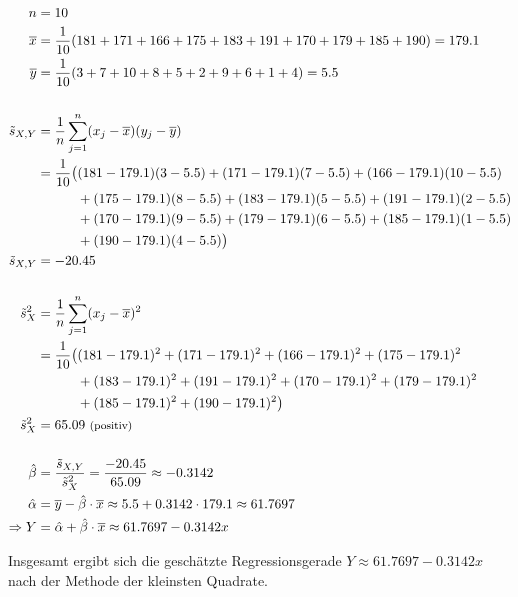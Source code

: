 {\allowdisplaybreaks
    \begin{align*}
        n &= 10 \\*
        \overline{x} &= \frac{1}{10} (181 + 171 + 166 + 175 + 183 +191 + 170 + 179 + 185 + 190) = 179.1 \\*
        \overline{y} &= \frac{1}{10} (3 + 7 + 10 + 8 + 5 + 2 + 9 + 6 + 1 + 4) = 5.5 \\*
        \nonumber \\
        \tilde{s}_{X,Y} &= \frac1n \sum_{j=1}^{n} (x_j - \overline{x})(y_j - \overline{y}) \\*
        &= \frac{1}{10} \big( (181 - 179.1) (3 - 5.5) + (171 - 179.1) (7 - 5.5) + (166 - 179.1) (10 - 5.5) \\*
            &\qquad\quad + (175 - 179.1) (8 - 5.5)  + (183 - 179.1) (5 - 5.5) + (191 - 179.1) (2 - 5.5) \\*
            &\qquad\quad + (170 - 179.1) (9 - 5.5) + (179 - 179.1) (6 - 5.5) + (185 - 179.1) (1 - 5.5) \\*
            &\qquad\quad + (190 - 179.1) (4 - 5.5) \big) \\*
        \tilde{s}_{X,Y} &= -20.45 \\
        \nonumber \\
        \tilde{s}_X^2 &= \frac1n \sum_{j=1}^{n} (x_j - \overline{x})^2 \\*
        &= \frac{1}{10} \big( (181 - 179.1)^2 + (171 - 179.1)^2 + (166 - 179.1)^2 + (175 - 179.1)^2 \\*
            &\qquad\quad + (183 - 179.1)^2 + (191 - 179.1)^2 + (170 - 179.1)^2 + (179 - 179.1)^2 \\*
            &\qquad\quad + (185 - 179.1)^2 + (190 - 179.1)^2 \big) \\*
        \tilde{s}_X^2 &= 65.09 ~{\text{\footnotesize(positiv)}} \\
        \nonumber \\
        \hat\beta &= \frac{\tilde{s}_{X,Y}}{\tilde{s}_X^2}
            = \frac{-20.45}{65.09} \approx -0.3142 \\*
        \hat\alpha &= \overline{y} - \hat\beta\cdot\overline{x} \approx 5.5 + 0.3142 \cdot 179.1 \approx 61.7697 \\*
        \Rightarrow Y &= \hat\alpha + \hat\beta \cdot \overline{x} \approx 61.7697 - 0.3142x
    \end{align*}
}

Insgesamt ergibt sich die geschätzte Regressionsgerade $Y \approx 61.7697 - 0.3142x$ nach der Methode der kleinsten Quadrate.


